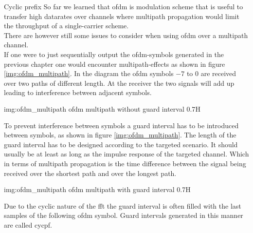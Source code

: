 \begin{subchapter}{Cyclic prefix}
  So far we learned that \gls{ofdm} is modulation scheme
  that is useful to transfer high datarates over channels
  where multipath propagation would limit the throughput of
  a single-carrier scheme. \\

  There are however still some issues to consider when using
  \gls{ofdm} over a multipath channel. \\

  If one were to just sequentially output the \acrshort{ofdm}-symbols
  generated in the previous chapter one would encounter multipath-effects
  as shown in figure \ref{img:ofdm_multipath}.
  In the diagram the \acrshort{ofdm} symbols $-7$ to $0$ are received
  over two paths of different length.
  At the receiver the two signals will add up leading to interference
  between adjacent symbols.

               {img:ofdm_multipath}
               {\acrshort{ofdm} multipath without guard interval}
               {0.7}{H}

  To prevent interference between symbols a guard interval has
  to be introduced between symbols, as shown in figure \ref{img:ofdm_multipath}.
  The length of the guard interval has to be designed according to
  the targeted scenario. It should usually be at least as long as the
  impulse response of the targeted channel.
  Which in terms of multipath propagation is the time difference between
  the signal being received over the shortest path and over the longest path.

               {img:ofdm_multipath}
               {\acrshort{ofdm} multipath with guard interval}
               {0.7}{H}

  Due to the cyclic nature of the \gls{fft} the guard interval
  is often filled with the last samples of the following \gls{ofdm}
  symbol. Guard intervals generated in this manner are called
  \gls{cycpf}.
\end{subchapter}

